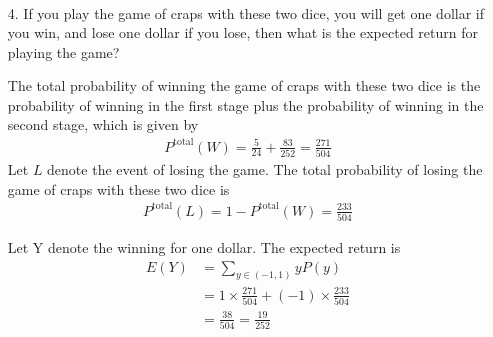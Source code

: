 \documentclass[aps,twocolumn,floatfix, nofootinbib, superscriptaddress]{revtex4-1}
\begin{document}
\begin{enumerate}
\begin{align}
     \end{align}

\item[4.] If you play the game of craps with these two dice, you will get one dollar if you win, and lose one dollar if you lose, then what is the expected return for playing the game?

The total probability of winning the game of craps with these two dice is the probability of winning in the first stage plus the probability of winning in the second stage, which is given by
\begin{align}
     	P^{\text{total}}(W) = \frac{5}{24} + \frac{83}{252} = \frac{271}{504}
     \end{align}
Let $L$ denote the event of losing the game. The total probability of losing the game of craps with these two dice is
\begin{align}
     	P^{\text{total}}(L) = 1- P^{\text{total}}(W) =\frac{233}{504}
     \end{align}
     
 Let Y denote the winning for one dollar. The expected return is 
\begin{align}
     	E(Y) & = \sum_{y\in (-1,1)}yP(y)  \nonumber\\&= 1\times \frac{271}{504} + (-1)\times \frac{233}{504}   \nonumber\\&
	= \frac{38}{504} = \frac{19}{252} 
     \end{align}
     
     \end{enumerate}
\end{document}
